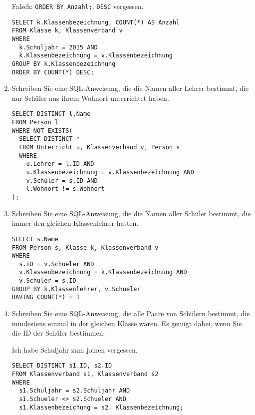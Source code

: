 \documentclass{lehramt-informatik}
\begin{document}
\begin{enumerate}
\begin{antwort}
Falsch: \verb|ORDER BY Anzahl;|. \verb|DESC| vergessen.

\begin{verbatim}
SELECT k.Klassenbezeichnung, COUNT(*) AS Anzahl
FROM Klasse k, Klassenverband v
WHERE
  k.Schuljahr = 2015 AND
  k.Klassenbezeichnung = v.Klassenbezeichnung
GROUP BY k.Klassenbezeichnung
ORDER BY COUNT(*) DESC;
\end{verbatim}
\end{antwort}


\item Schreiben Sie eine SQL-Anweisung, die die Namen aller Lehrer
bestimmt, die nur Schüler aus ihrem Wohnort unterrichtet haben.

\begin{antwort}
\begin{verbatim}
SELECT DISTINCT l.Name
FROM Person l
WHERE NOT EXISTS(
  SELECT DISTINCT *
  FROM Unterricht u, Klassenverband v, Person s
  WHERE
    u.Lehrer = l.ID AND
    u.Klassenbezeichnung = v.Klassenbezeichnung AND
    v.Schüler = s.ID AND
    l.Wohnort != s.Wohnort
);
\end{verbatim}
\end{antwort}


\item Schreiben Sie eine SQL-Anweisung, die die Namen aller Schüler
bestimmt, die immer den gleichen Klassenlehrer hatten.

\begin{antwort}
\begin{verbatim}
SELECT s.Name
FROM Person s, Klasse k, Klassenverband v
WHERE
  s.ID = v.Schueler AND
  v.Klassenbezeichnung = k.Klassenbezeichnung AND
  v.Schuler = s.ID
GROUP BY k.Klassenlehrer, v.Schueler
HAVING COUNT(*) = 1
\end{verbatim}
\end{antwort}


\item Schreiben Sie eine SQL-Anweisung, die alle Paare von Schülern
bestimmt, die mindestens einmal in der gleichen Klasse waren. Es genügt
dabei, wenn Sie die ID der Schüler bestimmen.

\begin{antwort}
Ich habe Schuljahr zum joinen vergessen.
\begin{verbatim}
SELECT DISTINCT s1.ID, s2.ID
FROM Klassenverband s1, Klassenverband s2
WHERE
  s1.Schuljahr = s2.Schuljahr AND
  s1.Schueler <> s2.Schueler AND
  s1.Klassenbezeichung = s2. Klassenbezeichnung;
\end{verbatim}
\end{antwort}


\end{enumerate}
\end{document}
